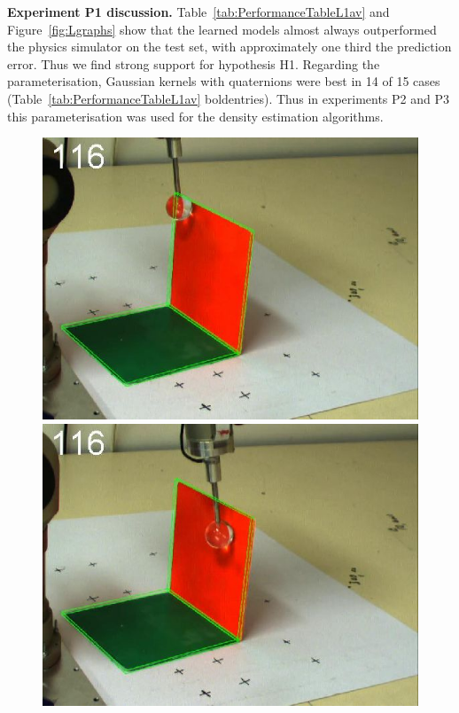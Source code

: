 \newlength{\imgAXwid}
\setlength{\imgAXwid}{2.15cm}

{\bf Experiment P1 discussion.} Table~\ref{tab:PerformanceTableL1av} and Figure~\ref{fig:Lgraphs} show that the learned models almost always outperformed the physics simulator on the test set, with approximately one third the prediction error. Thus we find strong support for hypothesis H1. Regarding the parameterisation, Gaussian kernels with quaternions were best in 14 of 15 cases  (Table~\ref{tab:PerformanceTableL1av} boldentries). Thus in experiments P2 and P3 this parameterisation was used for the density estimation algorithms.

\begin{figure}[htbp]
\centerline{
\includegraphics[width=\imgAXwid]{images/A1_2exp_667_1}
\includegraphics[width=\imgAXwid]{images/A1_2exp_876_1}
}
\end{figure}
